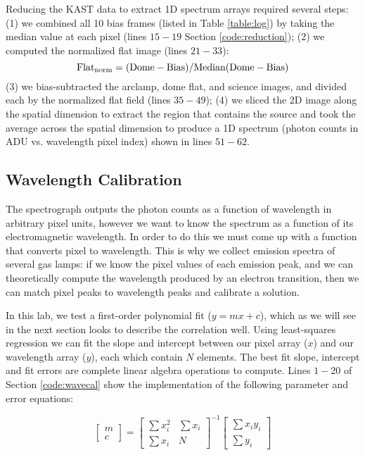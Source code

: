 \documentclass[preprint]{aastex62}
\begin{document}
Reducing the KAST data to extract 1D spectrum arrays required several steps: (1) we combined all 10 bias frames (listed in Table \ref{table:log}) by taking the median value at each pixel (lines $15-19$ Section \ref{code:reduction}); (2) we computed the normalized flat image (lines $21-33$): 
\begin{equation}
    {\rm Flat_{norm} = (Dome - Bias)/Median(Dome - Bias)} 
\end{equation}
(3) we bias-subtracted the arclamp, dome flat, and science images, and divided each by the normalized flat field (lines $35-49$); (4) we sliced the 2D image along the spatial dimension to extract the region that contains the source and took the average across the spatial dimension to produce a 1D spectrum (photon counts in ADU vs. wavelength pixel index) shown in lines $51-62$.


\subsection{Wavelength Calibration}
The spectrograph outputs the photon counts as a function of wavelength in arbitrary pixel units, however we want to know the spectrum as a function of its electromagnetic wavelength. In order to do this we must come up with a function that converts pixel to wavelength. This is why we collect emission spectra of several gas lamps: if we know the pixel values of each emission peak, and we can theoretically compute the wavelength produced by an electron transition, then we can match pixel peaks to wavelength peaks and calibrate a solution.

In this lab, we test a first-order polynomial fit ($y=mx+c$), which as we will see in the next section looks to describe the correlation well. Using least-squares regression we can fit the slope and intercept between our pixel array ($x$) and our wavelength array ($y$), each which contain $N$ elements. The best fit slope, intercept and fit errors are complete linear algebra operations to compute. Lines $1-20$ of Section \ref{code:wavecal} show the implementation of the following parameter and error equations:

\begin{equation}
\begin{bmatrix}
    m \\ c
\end{bmatrix}
= 
\begin{bmatrix}
    \sum x_i^2 & \sum x_i \\
    \sum x_i & N
\end{bmatrix}^{-1}
\begin{bmatrix}
    \sum x_i y_i \\ \sum y_i
\end{bmatrix}
\end{equation}
\end{document}
